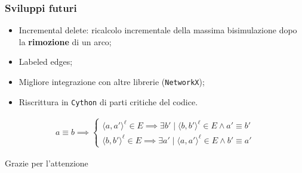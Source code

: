 \documentclass{beamer}
\begin{document}
\begin{frame}
    \frametitle{Sviluppi futuri}
    \begin{itemize}
        \item Incremental delete: ricalcolo incrementale della massima bisimulazione dopo la \textbf{rimozione} di un arco;
        \item Labeled edges;
        \item Migliore integrazione con altre librerie (\texttt{NetworkX});
        \item Riscrittura in \texttt{Cython} di parti critiche del codice.
    \end{itemize}

    \begin{gather*}
        a \equiv b \implies
        \begin{cases}
            \langle a, a' \rangle^\ell \in E \implies \exists b' \mid \langle b, b' \rangle^\ell \in E \land a' \equiv b'\\
            \langle b, b' \rangle^\ell \in E \implies \exists a' \mid \langle a, a' \rangle^\ell \in E \land b' \equiv a'
        \end{cases}
    \end{gather*}
\end{frame}

\begin{frame}
    Grazie per l'attenzione
\end{frame}
\end{document}
